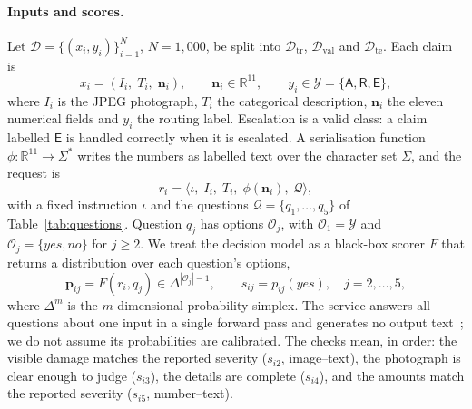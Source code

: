 \paragraph{Inputs and scores.}
Let $\mathcal{D}=\{(x_i,y_i)\}_{i=1}^{N}$, $N=1{,}000$, be split into $\mathcal{D}_{\mathrm{tr}}$, $\mathcal{D}_{\mathrm{val}}$ and $\mathcal{D}_{\mathrm{te}}$. Each claim is
\begin{equation}
x_i=(I_i,\;T_i,\;\mathbf{n}_i),\qquad \mathbf{n}_i\in\mathbb{R}^{11},\qquad y_i\in\mathcal{Y}=\{\mathsf{A},\mathsf{R},\mathsf{E}\}, \label{eq:input}
\end{equation}
where $I_i$ is the JPEG photograph, $T_i$ the categorical description, $\mathbf{n}_i$ the eleven numerical fields and $y_i$ the routing label. Escalation is a valid class: a claim labelled $\mathsf{E}$ is handled correctly when it is escalated. A serialisation function $\phi:\mathbb{R}^{11}\rightarrow\Sigma^{*}$ writes the numbers as labelled text over the character set $\Sigma$, and the request is
\begin{equation}
r_i=\big\langle \iota,\; I_i,\; T_i,\; \phi(\mathbf{n}_i),\; \mathcal{Q}\big\rangle, \label{eq:request}
\end{equation}
with a fixed instruction $\iota$ and the questions $\mathcal{Q}=\{q_1,\dots,q_5\}$ of Table~\ref{tab:questions}. Question $q_j$ has options $\mathcal{O}_j$, with $\mathcal{O}_1=\mathcal{Y}$ and $\mathcal{O}_j=\{\textit{yes},\textit{no}\}$ for $j\ge2$. We treat the decision model as a black-box scorer $F$ that returns a distribution over each question's options,
\begin{equation}
\mathbf{p}_{ij}=F(r_i,q_j)\in\Delta^{|\mathcal{O}_j|-1},\qquad s_{ij}=p_{ij}(\textit{yes}),\quad j=2,\dots,5, \label{eq:scores}
\end{equation}
where $\Delta^{m}$ is the $m$-dimensional probability simplex. The service answers all questions about one input in a single forward pass and generates no output text~\cite{google2026decisions}; we do not assume its probabilities are calibrated. The checks mean, in order: the visible damage matches the reported severity ($s_{i2}$, image--text), the photograph is clear enough to judge ($s_{i3}$), the details are complete ($s_{i4}$), and the amounts match the reported severity ($s_{i5}$, number--text).

